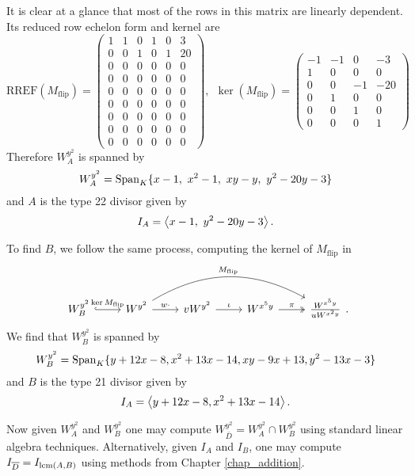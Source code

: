It is clear at a glance that most of the rows in this matrix are linearly dependent.
Its reduced row echelon form and kernel are
\[ \text{RREF}(M_{\text{flip}}) =
\begin{pmatrix}
  1 &  1 &  0 &  1 &  0 &  3 \\
  0 &  0 &  1 &  0 &  1 & 20 \\
  0 &  0 &  0 &  0 &  0 &  0 \\
  0 &  0 &  0 &  0 &  0 &  0 \\
  0 &  0 &  0 &  0 &  0 &  0 \\
  0 &  0 &  0 &  0 &  0 &  0 \\
  0 &  0 &  0 &  0 &  0 &  0 \\
  0 &  0 &  0 &  0 &  0 &  0 \\
  0 &  0 &  0 &  0 &  0 &  0
\end{pmatrix}, ~~
\ker(M_{\text{flip}}) = 
\begin{pmatrix}
  -1 & -1 &  0 &  -3 \\
   1 &  0 &  0 &   0 \\
   0 &  0 & -1 & -20 \\
   0 &  1 &  0 &   0 \\
   0 &  0 &  1 &   0 \\
   0 &  0 &  0 &   1
\end{pmatrix} \]
Therefore $W_A^{y^2}$ is spanned by
  \[ W_A^{y^2} = \operatorname{Span}_K \{ x - 1, ~x^2 - 1, ~xy - y, ~y^2 - 20y - 3 \} \]
and $A$ is the type 22 divisor given by
  \[I_A = \left\langle x - 1, ~y^2 - 20y - 3 \right\rangle.\]

To find $B$, we follow the same process, computing the kernel of $M_{\text{flip}}$ in
\[ \begin{tikzcd}
  W_B^{y^2} \arrow[hook]{r}{\ker M_{\text{flip}}} &
  W^{y^2} \arrow{r}{w \cdot} \arrow[bend left]{rrr}{M_{\text{flip}}} &
  vW^{y^2} \arrow{r}{\iota} &
  W^{x^5y} \arrow[two heads]{r}{\pi} &
  \frac {W^{x^5y}} {uW^{x^2y}}
\end{tikzcd}. \]
We find that $W_B^{y^2}$ is spanned by
  \[ W_B^{y^2} = \operatorname{Span}_K \{ y + 12x - 8, x^2 + 13x - 14, xy - 9x + 13, y^2 - 13x - 3 \} \]
and $B$ is the type 21 divisor given by
  \[I_A = \left\langle y + 12x - 8, x^2 + 13x - 14 \right\rangle.\]
  
Now given $W_A^{y^2}$ and $W_B^{y^2}$ one may compute $W_{\bar D}^{y^2} = W_A^{y^2} \cap W_B^{y^2}$
using standard linear algebra techniques.
Alternatively, given $I_A$ and $I_B$,
one may compute $I_{\overline D} = I_{\operatorname{lcm}(A,B)}$ using methods from Chapter \ref{chap_addition}.

